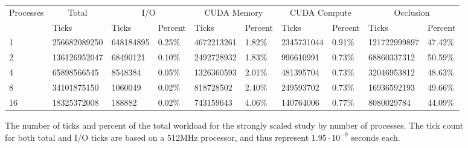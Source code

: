\documentclass[conference]{IEEEtran}
\begin{document}
\begin{figure}
\begin{tabular}{|l|l|ll|ll|ll|ll|}
\hline
\multirow{2}{*}{Processes} & \multicolumn{1}{c|}{Total} & \multicolumn{2}{c|}{I/O}                 & \multicolumn{2}{c|}{CUDA Memory}          & \multicolumn{2}{c|}{CUDA Compute}         & \multicolumn{2}{c|}{Occlusion}              \\ \cline{2-10} 
                           & Ticks                      & \multicolumn{1}{l|}{Ticks}     & Percent & \multicolumn{1}{l|}{Ticks}      & Percent & \multicolumn{1}{l|}{Ticks}      & Percent & \multicolumn{1}{l|}{Ticks}        & Percent \\ \hline
1                          & 256682089250               & \multicolumn{1}{l|}{648184895} & 0.25\%  & \multicolumn{1}{l|}{4672213261} & 1.82\%  & \multicolumn{1}{l|}{2345731044} & 0.91\%  & \multicolumn{1}{l|}{121722999897} & 47.42\% \\ \hline
2                          & 136126952047               & \multicolumn{1}{l|}{68490121}  & 0.10\%  & \multicolumn{1}{l|}{2492728932} & 1.83\%  & \multicolumn{1}{l|}{996610991}  & 0.73\%  & \multicolumn{1}{l|}{68860337312}  & 50.59\% \\ \hline
4                          & 65898566545                & \multicolumn{1}{l|}{8548384}   & 0.05\%  & \multicolumn{1}{l|}{1326360593} & 2.01\%  & \multicolumn{1}{l|}{481395704}  & 0.73\%  & \multicolumn{1}{l|}{32046953812}  & 48.63\% \\ \hline
8                          & 34101875150                & \multicolumn{1}{l|}{1060049}   & 0.02\%  & \multicolumn{1}{l|}{818728502}  & 2.40\%  & \multicolumn{1}{l|}{249593702}  & 0.73\%  & \multicolumn{1}{l|}{16936592193}  & 49.66\% \\ \hline
16                         & 18325372008                & \multicolumn{1}{l|}{188882}    & 0.02\%  & \multicolumn{1}{l|}{743159643}  & 4.06\%  & \multicolumn{1}{l|}{140764006}  & 0.77\%  & \multicolumn{1}{l|}{8080029784}   & 44.09\% \\ \hline
\end{tabular}
\caption{The number of ticks and percent of the total workload for the strongly scaled study by number of processes. The tick count for both total and I/O ticks are based on a 512MHz processor, and thus represent $1.95\cdot 10^{-9}$ seconds each.}
\label{fig:strongtable_ticks}
\end{figure}
\end{document}
